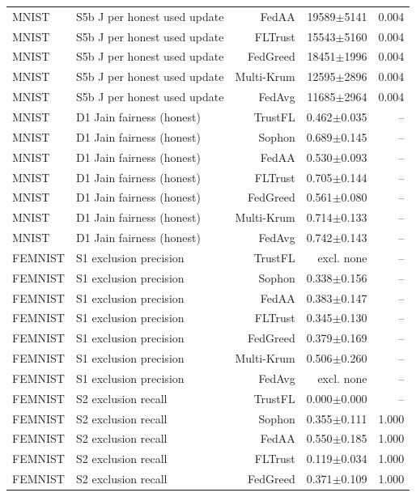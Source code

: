 \begin{tabular}{llrrr}
MNIST & S5b J per honest used update & FedAA & 19589$\pm$5141 & 0.004 \\
MNIST & S5b J per honest used update & FLTrust & 15543$\pm$5160 & 0.004 \\
MNIST & S5b J per honest used update & FedGreed & 18451$\pm$1996 & 0.004 \\
MNIST & S5b J per honest used update & Multi-Krum & 12595$\pm$2896 & 0.004 \\
MNIST & S5b J per honest used update & FedAvg & 11685$\pm$2964 & 0.004 \\
MNIST & D1 Jain fairness (honest) & TrustFL & 0.462$\pm$0.035 & -- \\
MNIST & D1 Jain fairness (honest) & Sophon & 0.689$\pm$0.145 & -- \\
MNIST & D1 Jain fairness (honest) & FedAA & 0.530$\pm$0.093 & -- \\
MNIST & D1 Jain fairness (honest) & FLTrust & 0.705$\pm$0.144 & -- \\
MNIST & D1 Jain fairness (honest) & FedGreed & 0.561$\pm$0.080 & -- \\
MNIST & D1 Jain fairness (honest) & Multi-Krum & 0.714$\pm$0.133 & -- \\
MNIST & D1 Jain fairness (honest) & FedAvg & 0.742$\pm$0.143 & -- \\
FEMNIST & S1 exclusion precision & TrustFL & excl. none & -- \\
FEMNIST & S1 exclusion precision & Sophon & 0.338$\pm$0.156 & -- \\
FEMNIST & S1 exclusion precision & FedAA & 0.383$\pm$0.147 & -- \\
FEMNIST & S1 exclusion precision & FLTrust & 0.345$\pm$0.130 & -- \\
FEMNIST & S1 exclusion precision & FedGreed & 0.379$\pm$0.169 & -- \\
FEMNIST & S1 exclusion precision & Multi-Krum & 0.506$\pm$0.260 & -- \\
FEMNIST & S1 exclusion precision & FedAvg & excl. none & -- \\
FEMNIST & S2 exclusion recall & TrustFL & 0.000$\pm$0.000 & -- \\
FEMNIST & S2 exclusion recall & Sophon & 0.355$\pm$0.111 & 1.000 \\
FEMNIST & S2 exclusion recall & FedAA & 0.550$\pm$0.185 & 1.000 \\
FEMNIST & S2 exclusion recall & FLTrust & 0.119$\pm$0.034 & 1.000 \\
FEMNIST & S2 exclusion recall & FedGreed & 0.371$\pm$0.109 & 1.000 \\

\end{tabular}
